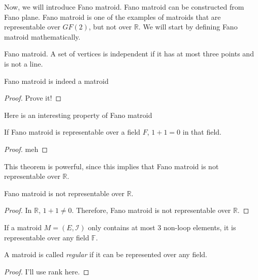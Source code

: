 Now, we will introduce Fano matroid.
Fano matroid can be constructed from Fano plane.
Fano matroid is one of the examples of matroids that are representable over $GF(2)$, but not over $\mathbb{R}$.
We will start by defining Fano matroid mathematically.

\begin{defn}
Fano matroid.  A set of vertices is independent if it has at most three points and is not a line.
\end{defn}

\begin{thm}
Fano matroid is indeed a matroid
\end{thm}

\begin{proof}
Prove it!
\end{proof}


Here is an interesting property of Fano matroid
\begin{thm}
If Fano matroid is representable over a field $F$, $1 + 1 = 0$ in that field.
\end{thm}

\begin{proof}
meh
\end{proof}

This theorem is powerful, since this implies that Fano matroid is not representable over $\mathbb{R}$.
\begin{cor}
Fano matroid is not representable over $\mathbb{R}$.
\end{cor}

\begin{proof}
In $\mathbb{R}$, $1 + 1 \neq 0$. Therefore, Fano matroid is not representable over $\mathbb{R}$.
\end{proof}


\begin{thm}
If a matroid $M = (E, \mathcal{I})$ only contains at most 3 non-loop elements, it is representable over any field $\mathbb{F}$.
\end{thm}

A matroid is called \textit{regular} if it can be represented over any field.

\begin{proof}
I'll use rank here.
\end{proof}


